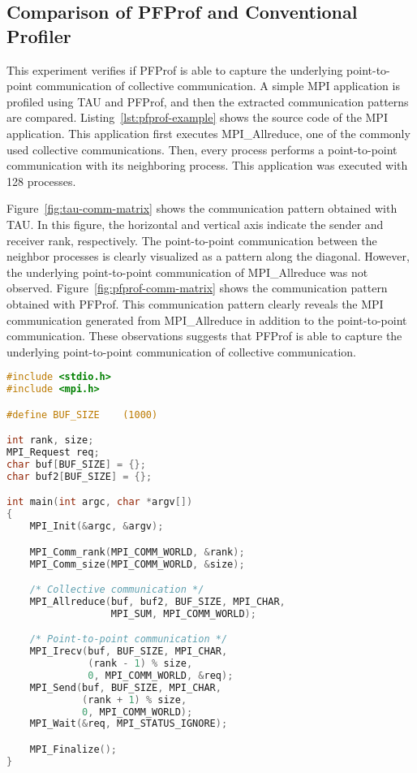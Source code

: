 \subsection{Comparison of PFProf and Conventional Profiler}%
\label{sec:ii-eval-pfprof}

This experiment verifies if PFProf is able to capture the underlying
point-to-point communication of collective communication. A simple
MPI application is profiled using TAU and PFProf, and then the extracted
communication patterns are compared. Listing~\ref{lst:pfprof-example} shows
the source code of the MPI application. This application first executes
MPI\_Allreduce, one of the commonly used collective communications. Then,
every process performs a point-to-point communication with its neighboring
process. This application was executed with 128 processes.

Figure~\ref{fig:tau-comm-matrix} shows the communication pattern obtained with
TAU\@. In this figure, the horizontal and vertical axis indicate the sender and
receiver rank, respectively. The point-to-point communication between the
neighbor processes is clearly visualized as  a pattern along the diagonal.
However, the underlying point-to-point communication of MPI\_Allreduce was not
observed. Figure~\ref{fig:pfprof-comm-matrix} shows the communication pattern
obtained with PFProf. This communication pattern clearly reveals the MPI
communication generated from MPI\_Allreduce in addition to the point-to-point
communication. These observations suggests that PFProf is able to capture the
underlying point-to-point communication of collective communication.

\begin{lstlisting}[caption={MPI Application Used for Evaluation},
                   label=lst:pfprof-example, float, language=C]
#include <stdio.h>
#include <mpi.h>

#define BUF_SIZE    (1000)

int rank, size;
MPI_Request req;
char buf[BUF_SIZE] = {};
char buf2[BUF_SIZE] = {};

int main(int argc, char *argv[])
{
    MPI_Init(&argc, &argv);

    MPI_Comm_rank(MPI_COMM_WORLD, &rank);
    MPI_Comm_size(MPI_COMM_WORLD, &size);

    /* Collective communication */
    MPI_Allreduce(buf, buf2, BUF_SIZE, MPI_CHAR,
                  MPI_SUM, MPI_COMM_WORLD);

    /* Point-to-point communication */
    MPI_Irecv(buf, BUF_SIZE, MPI_CHAR,
              (rank - 1) % size,
              0, MPI_COMM_WORLD, &req);
    MPI_Send(buf, BUF_SIZE, MPI_CHAR,
             (rank + 1) % size,
             0, MPI_COMM_WORLD);
    MPI_Wait(&req, MPI_STATUS_IGNORE);

    MPI_Finalize();
}
\end{lstlisting}


